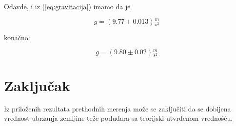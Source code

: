 Odavde, i iz (\ref{eq:gravitacija}) imamo da je

\begin{equation}
    g = (9.77 \pm 0.013) \tfrac{m}{s^2}
\end{equation}

konačno:

\begin{equation}
    \boxed{
      g = (9.80 \pm 0.02) \tfrac{m}{s^2}
    }
\end{equation}

\section{Zaključak}

Iz priloženih rezultata prethodnih merenja može se zaključiti da se dobijena vrednost ubrzanja zemljine teže podudara sa teorijski utvrđenom vrednošću.


